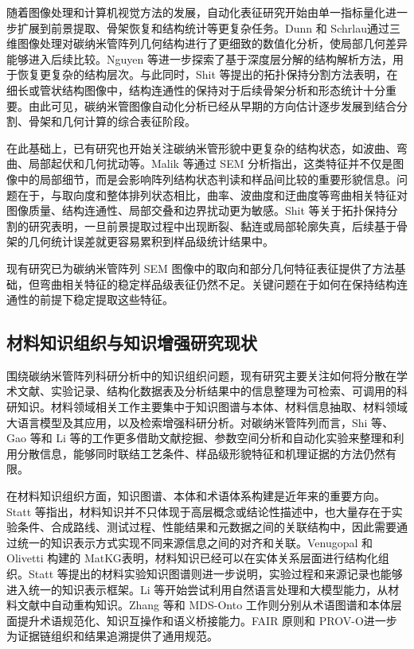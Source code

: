 随着图像处理和计算机视觉方法的发展，自动化表征研究开始由单一指标量化进一步扩展到前景提取、骨架恢复和结构统计等更复杂任务。Dunn 和 Schrlau\cite{Dunn2018CNT3D}通过三维图像处理对碳纳米管阵列几何结构进行了更细致的数值化分析，使局部几何差异能够进入后续比较。Nguyen 等\cite{Nguyen2023CNTNeRF}进一步探索了基于深度层分解的结构解析方法，用于恢复更复杂的结构层次。与此同时，Shit 等\cite{Shit2021clDice}提出的拓扑保持分割方法表明，在细长或管状结构图像中，结构连通性的保持对于后续骨架分析和形态统计十分重要。由此可见，碳纳米管图像自动化分析已经从早期的方向估计逐步发展到结合分割、骨架和几何计算的综合表征阶段。

在此基础上，已有研究也开始关注碳纳米管形貌中更复杂的结构状态，如波曲、弯曲、局部起伏和几何扰动等。Malik 等\cite{Malik2011SEMAnalysis}通过 SEM 分析指出，这类特征并不仅是图像中的局部细节，而是会影响阵列结构状态判读和样品间比较的重要形貌信息。问题在于，与取向度和整体排列状态相比，曲率、波曲度和迂曲度等弯曲相关特征对图像质量、结构连通性、局部交叠和边界扰动更为敏感。Shit 等关于拓扑保持分割的研究表明，一旦前景提取过程中出现断裂、黏连或局部轮廓失真，后续基于骨架的几何统计误差就更容易累积到样品级统计结果中\cite{Shit2021clDice}。

现有研究已为碳纳米管阵列 SEM 图像中的取向和部分几何特征表征提供了方法基础，但弯曲相关特征的稳定样品级表征仍然不足。关键问题在于如何在保持结构连通性的前提下稳定提取这些特征。

\subsection{材料知识组织与知识增强研究现状}

围绕碳纳米管阵列科研分析中的知识组织问题，现有研究主要关注如何将分散在学术文献、实验记录、结构化数据表及分析结果中的信息整理为可检索、可调用的科研知识。材料领域相关工作主要集中于知识图谱与本体、材料信息抽取、材料领域大语言模型及其应用，以及检索增强科研分析。对碳纳米管阵列而言，Shi 等\cite{Shi2017CNTParameterSpace}、Gao 等\cite{Gao2023}和 Li 等\cite{Li2025Matter}的工作更多借助文献挖掘、参数空间分析和自动化实验来整理和利用分散信息，能够同时联结工艺条件、样品级形貌特征和机理证据的方法仍然有限。

在材料知识组织方面，知识图谱、本体和术语体系构建是近年来的重要方向。Statt 等\cite{Statt2023}指出，材料知识并不只体现于高层概念或结论性描述中，也大量存在于实验条件、合成路线、测试过程、性能结果和元数据之间的关联结构中，因此需要通过统一的知识表示方式实现不同来源信息之间的对齐和关联。Venugopal 和 Olivetti 构建的 MatKG\cite{Venugopal2024}表明，材料知识已经可以在实体关系层面进行结构化组织。Statt 等提出的材料实验知识图谱\cite{Statt2023}则进一步说明，实验过程和来源记录也能够进入统一的知识表示框架。Li 等\cite{Li2026KnowledgeReconstruction}开始尝试利用自然语言处理和大模型能力，从材料文献中自动重构知识。Zhang 等\cite{Zhang2024TerminologyKG}和 MDS-Onto 工作\cite{MDSOnto2025}则分别从术语图谱和本体层面提升术语规范化、知识互操作和语义桥接能力。FAIR 原则\cite{Wilkinson2016FAIR}和 PROV-O\cite{Lebo2013PROVO}进一步为证据链组织和结果追溯提供了通用规范。

